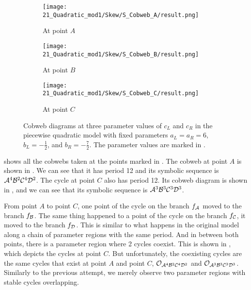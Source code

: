 \begin{figure}
	\centering
	\begin{subfigure}{0.3\textwidth}
		\centering
		\texttt{[image: 21\_Quadratic\_mod1/Skew/S\_Cobweb\_A/result.png]}
		\caption{At point $A$}
		\label{fig:setup.quad.skew.cobweb.A}
	\end{subfigure}
	\begin{subfigure}{0.3\textwidth}
		\centering
		\texttt{[image: 21\_Quadratic\_mod1/Skew/S\_Cobweb\_B/result.png]}
		\caption{At point $B$}
		\label{fig:setup.quad.skew.cobweb.B}
	\end{subfigure}
	\begin{subfigure}{0.3\textwidth}
		\centering
		\texttt{[image: 21\_Quadratic\_mod1/Skew/S\_Cobweb\_C/result.png]}
		\caption{At point $C$}
		\label{fig:setup.quad.skew.cobweb.C}
	\end{subfigure}
	\caption[Cobwebs of the skewed piecewise quadratic model]{
		Cobweb diagrams at three parameter values of $c_L$ and $c_R$ in the piecewise quadratic model with fixed parameters $a_L = a_R = 6$, $b_L = -\frac{1}{2}$, and $b_R = -\frac{7}{2}$.
		The parameter values are marked in .
	}
	\label{fig:setup.quad.skew.cobwebs}
\end{figure}

 shows all the cobwebs taken at the points marked in .
The cobweb at point $A$ is shown in .
We can see that it has period 12 and its symbolic sequence is $\mathcal{A}^4\mathcal{B}^2\mathcal{C}^4\mathcal{D}^2$.
The cycle at point $C$ also has period 12.
Its cobweb diagram is shown in , and we can see that its symbolic sequence is $\mathcal{A}^3\mathcal{B}^3\mathcal{C}^3\mathcal{D}^3$.

From point $A$ to point $C$, one point of the cycle on the branch $f_{\mathcal{A}}$ moved to the branch $f_{\mathcal{B}}$.
The same thing happened to a point of the cycle on the branch $f_{\mathcal{C}}$, it moved to the branch $f_{\mathcal{D}}$.
This is similar to what happens in the original model along a chain of parameter regions with the same period.
And in between both points, there is a parameter region where 2 cycles coexist.
This is shown in , which depicts the cycles at point $C$.
But unfortunately, the coexisting cycles are the same cycles that exist at point $A$ and point $C$, $\mathcal{O}_{\mathcal{A}^4\mathcal{B}^2\mathcal{C}^4\mathcal{D}^2}$ and $\mathcal{O}_{\mathcal{A}^3\mathcal{B}^3\mathcal{C}^3\mathcal{D}^3}$.
Similarly to the previous attempt, we merely observe two parameter regions with stable cycles overlapping.
